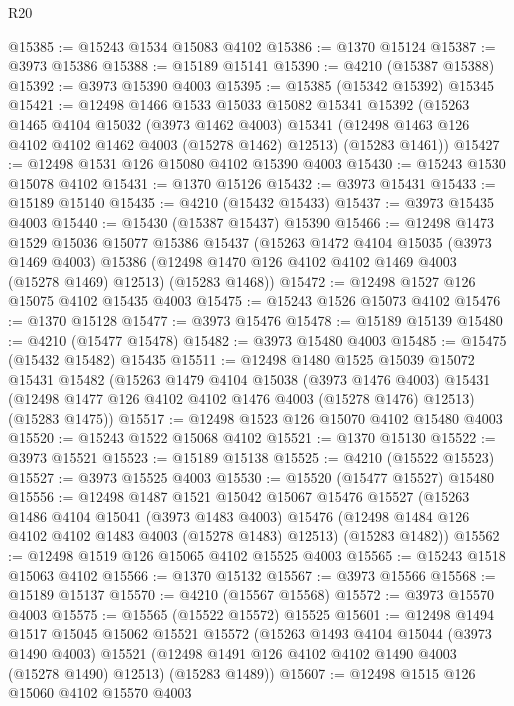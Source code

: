 \begin{lexlean}{R20}
\begin{coremodule}
@15385 := @15243 @1534 @15083 @4102
@15386 := @1370 @15124
@15387 := @3973 @15386
@15388 := @15189 @15141
@15390 := @4210 (@15387 @15388)
@15392 := @3973 @15390 @4003
@15395 := @15385 (@15342 @15392) @15345
@15421 := @12498
    @1466
    @1533
    @15033
    @15082
    @15341
    @15392
    (@15263
      @1465
      @4104
      @15032
      (@3973 @1462 @4003)
      @15341
      (@12498 @1463 @126 @4102 @4102 @1462 @4003 (@15278 @1462) @12513)
      (@15283 @1461))
@15427 := @12498 @1531 @126 @15080 @4102 @15390 @4003
@15430 := @15243 @1530 @15078 @4102
@15431 := @1370 @15126
@15432 := @3973 @15431
@15433 := @15189 @15140
@15435 := @4210 (@15432 @15433)
@15437 := @3973 @15435 @4003
@15440 := @15430 (@15387 @15437) @15390
@15466 := @12498
    @1473
    @1529
    @15036
    @15077
    @15386
    @15437
    (@15263
      @1472
      @4104
      @15035
      (@3973 @1469 @4003)
      @15386
      (@12498 @1470 @126 @4102 @4102 @1469 @4003 (@15278 @1469) @12513)
      (@15283 @1468))
@15472 := @12498 @1527 @126 @15075 @4102 @15435 @4003
@15475 := @15243 @1526 @15073 @4102
@15476 := @1370 @15128
@15477 := @3973 @15476
@15478 := @15189 @15139
@15480 := @4210 (@15477 @15478)
@15482 := @3973 @15480 @4003
@15485 := @15475 (@15432 @15482) @15435
@15511 := @12498
    @1480
    @1525
    @15039
    @15072
    @15431
    @15482
    (@15263
      @1479
      @4104
      @15038
      (@3973 @1476 @4003)
      @15431
      (@12498 @1477 @126 @4102 @4102 @1476 @4003 (@15278 @1476) @12513)
      (@15283 @1475))
@15517 := @12498 @1523 @126 @15070 @4102 @15480 @4003
@15520 := @15243 @1522 @15068 @4102
@15521 := @1370 @15130
@15522 := @3973 @15521
@15523 := @15189 @15138
@15525 := @4210 (@15522 @15523)
@15527 := @3973 @15525 @4003
@15530 := @15520 (@15477 @15527) @15480
@15556 := @12498
    @1487
    @1521
    @15042
    @15067
    @15476
    @15527
    (@15263
      @1486
      @4104
      @15041
      (@3973 @1483 @4003)
      @15476
      (@12498 @1484 @126 @4102 @4102 @1483 @4003 (@15278 @1483) @12513)
      (@15283 @1482))
@15562 := @12498 @1519 @126 @15065 @4102 @15525 @4003
@15565 := @15243 @1518 @15063 @4102
@15566 := @1370 @15132
@15567 := @3973 @15566
@15568 := @15189 @15137
@15570 := @4210 (@15567 @15568)
@15572 := @3973 @15570 @4003
@15575 := @15565 (@15522 @15572) @15525
@15601 := @12498
    @1494
    @1517
    @15045
    @15062
    @15521
    @15572
    (@15263
      @1493
      @4104
      @15044
      (@3973 @1490 @4003)
      @15521
      (@12498 @1491 @126 @4102 @4102 @1490 @4003 (@15278 @1490) @12513)
      (@15283 @1489))
@15607 := @12498 @1515 @126 @15060 @4102 @15570 @4003

\end{coremodule}
\end{lexlean}
